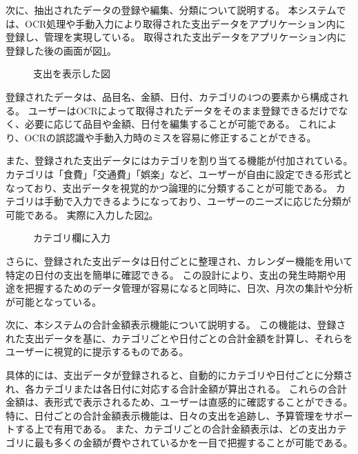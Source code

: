 \documentclass[main]{subfiles}
\begin{document}
次に、抽出されたデータの登録や編集、分類について説明する。
本システムでは、OCR処理や手動入力により取得された支出データをアプリケーション内に登録し、管理を実現している。
取得された支出データをアプリケーション内に登録した後の画面が図\ref{fig:Registration}。

\begin{figure}[tb]
    \begin{center}
        \caption{支出を表示した図}
        \label{fig:Registration}
    \end{center}
\end{figure}

登録されたデータは、品目名、金額、日付、カテゴリの4つの要素から構成される。
ユーザーはOCRによって取得されたデータをそのまま登録できるだけでなく、必要に応じて品目や金額、日付を編集することが可能である。
これにより、OCRの誤認識や手動入力時のミスを容易に修正することができる。

また、登録された支出データにはカテゴリを割り当てる機能が付加されている。
カテゴリは「食費」「交通費」「娯楽」など、ユーザーが自由に設定できる形式となっており、支出データを視覚的かつ論理的に分類することが可能である。
カテゴリは手動で入力できるようになっており、ユーザーのニーズに応じた分類が可能である。
実際に入力した図\ref{fig:classification}。

\begin{figure}[tb]
    \begin{center}
        \caption{カテゴリ欄に入力}
        \label{fig:classification}
    \end{center}
\end{figure}

さらに、登録された支出データは日付ごとに整理され、カレンダー機能を用いて特定の日付の支出を簡単に確認できる。
この設計により、支出の発生時期や用途を把握するためのデータ管理が容易になると同時に、日次、月次の集計や分析が可能となっている。

次に、本システムの合計金額表示機能について説明する。
この機能は、登録された支出データを基に、カテゴリごとや日付ごとの合計金額を計算し、それらをユーザーに視覚的に提示するものである。

具体的には、支出データが登録されると、自動的にカテゴリや日付ごとに分類され、各カテゴリまたは各日付に対応する合計金額が算出される。
これらの合計金額は、表形式で表示されるため、ユーザーは直感的に確認することができる。
特に、日付ごとの合計金額表示機能は、日々の支出を追跡し、予算管理をサポートする上で有用である。
また、カテゴリごとの合計金額表示は、どの支出カテゴリに最も多くの金額が費やされているかを一目で把握することが可能である。
\end{document}
